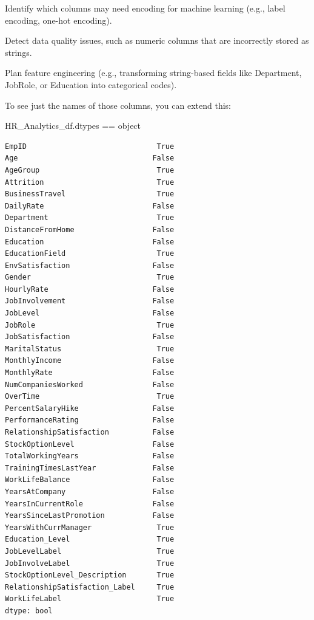 \documentclass[
  letterpaper,
  DIV=11,
  numbers=noendperiod]{scrartcl}
\newenvironment{Shaded}{\begin{snugshade}}{\end{snugshade}}
\newcommand{\BuiltInTok}[1]{\textcolor[rgb]{0.00,0.23,0.31}{#1}}
\newcommand{\NormalTok}[1]{\textcolor[rgb]{0.00,0.23,0.31}{#1}}
\newcommand{\OperatorTok}[1]{\textcolor[rgb]{0.37,0.37,0.37}{#1}}
\begin{document}
Identify which columns may need encoding for machine learning (e.g.,
label encoding, one-hot encoding).

Detect data quality issues, such as numeric columns that are incorrectly
stored as strings.

Plan feature engineering (e.g., transforming string-based fields like
Department, JobRole, or Education into categorical codes).

To see just the names of those columns, you can extend this:

\begin{Shaded}
\begin{Highlighting}[]
\NormalTok{HR\_Analytics\_df.dtypes }\OperatorTok{==} \BuiltInTok{object}
\end{Highlighting}
\end{Shaded}

\begin{verbatim}
EmpID                              True
Age                               False
AgeGroup                           True
Attrition                          True
BusinessTravel                     True
DailyRate                         False
Department                         True
DistanceFromHome                  False
Education                         False
EducationField                     True
EnvSatisfaction                   False
Gender                             True
HourlyRate                        False
JobInvolvement                    False
JobLevel                          False
JobRole                            True
JobSatisfaction                   False
MaritalStatus                      True
MonthlyIncome                     False
MonthlyRate                       False
NumCompaniesWorked                False
OverTime                           True
PercentSalaryHike                 False
PerformanceRating                 False
RelationshipSatisfaction          False
StockOptionLevel                  False
TotalWorkingYears                 False
TrainingTimesLastYear             False
WorkLifeBalance                   False
YearsAtCompany                    False
YearsInCurrentRole                False
YearsSinceLastPromotion           False
YearsWithCurrManager               True
Education_Level                    True
JobLevelLabel                      True
JobInvolveLabel                    True
StockOptionLevel_Description       True
RelationshipSatisfaction_Label     True
WorkLifeLabel                      True
dtype: bool
\end{verbatim}
\end{document}
